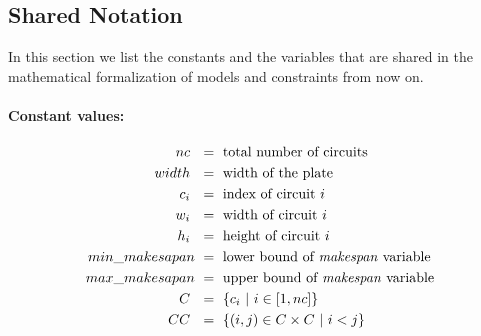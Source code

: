 
\subsection{Shared Notation} \label{sec:shared_variables}
    In this section we list the constants and the variables that are shared in the mathematical formalization of 
    models and constraints from now on.

    \paragraph{Constant values:}
    \begin{align*}
        nc\             &\ =\ \text{total number of circuits}                   \\
        width\          &\ =\ \text{width of the plate}                         \\
        c_i\            &\ =\ \text{index of circuit  } i                       \\
        w_i\            &\ =\ \text{width of circuit  } i                       \\
        h_i\            &\ =\ \text{height of circuit  } i                      \\
        min\_makesapan  &\ =\ \text{lower bound of \textit{makespan} variable}  \\
        max\_makesapan  &\ =\ \text{upper bound of \textit{makespan} variable}  \\
        C\              &\ =\ \{ c_i\ |\ i \in [1, nc]\}                         \\        
        CC\             &\ =\ \{(i, j) \in C \times C\ |\ i<j \}
    \end{align*}

